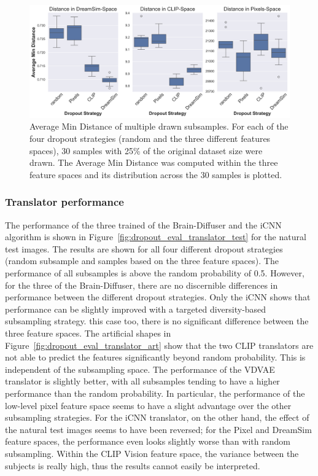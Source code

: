 \begin{figure}[ht]
  \centering
  \includegraphics[width=1\textwidth]{plots/dropout_avg_min_distance.png}
  \caption[Average Min Distance with different dropout strategies]{Average Min Distance of multiple drawn subsamples. For each of the four dropout strategies (random and the three different features spaces), 30 samples with 25\% of the original dataset size were drawn. The Average Min Distance was computed within the three feature spaces and its distribution across the 30 samples is plotted.}\label{fig:dropout_avg_min_distance}
\end{figure}


\subsubsection{Translator performance}
The performance of the three trained  of the Brain-Diffuser and the iCNN algorithm is shown in Figure~\ref{fig:dropout_eval_translator_test} for the natural test images. The results are shown for all four different dropout strategies (random subsample and samples based on the three feature spaces). The performance of all subsamples is above the random probability of 0.5. However, for the three  of the Brain-Diffuser, there are no discernible differences in performance between the different dropout strategies. Only the iCNN  shows that performance can be slightly improved with a targeted diversity-based subsampling strategy.  this case too, there is no significant difference between the three feature spaces. The artificial shapes in Figure~\ref{fig:dropout_eval_translator_art} show that the two CLIP translators are not able to predict the features significantly beyond random probability. This is independent of the subsampling space. The performance of the VDVAE translator is slightly better, with all subsamples tending to have a higher performance than the random probability. In particular, the performance of the low-level pixel feature space seems to have a slight advantage over the other subsampling strategies. For the iCNN translator, on the other hand, the effect of the natural test images seems to have been reversed; for the Pixel and DreamSim feature spaces, the performance even looks slightly worse than with random subsampling. Within the CLIP Vision feature space, the variance between the subjects is really high, thus the results cannot easily be interpreted.

